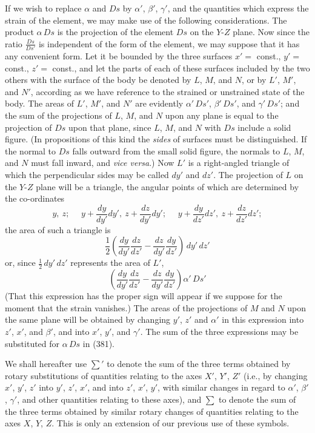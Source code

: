 \documentclass[12pt]{article}
\begin{document}
{If we wish to replace $\alpha$ and $Ds$ by $\alpha'$, $\beta'$, $\gamma'$, and the quantities which express the strain of the element, we may make use of the following considerations. The product $\alpha \, Ds$ is the projection of the element $Ds$ on the $Y$-$Z$ plane. Now since the ratio $\frac{Ds}{Ds'}$ is independent of the form of the element, we may suppose that it has any convenient form. Let it be bounded by the three surfaces $x'=$ const., $y'=$ const., $z'=$ const., and let the parts of each of these surfaces included by the two others with the surface of the body be denoted by $L$, $M$, and $N$, or by $L'$, $M'$, and $N'$, according as we have reference to the strained or unstrained state of the body. The areas of $L'$, $M'$, and $N'$ are evidently $\alpha'\,Ds'$, $\beta'\,Ds'$, and $\gamma'\,Ds'$; and the sum of the projections of $L$, $M$, and $N$ upon any plane is equal to the projection of $Ds$ upon that plane, since $L$, $M$, and $N$ with $Ds$ include a solid figure. (In propositions of this kind the \textit{sides} of surfaces must be distinguished. If the normal to $Ds$ falls outward from the small solid figure, the normals to $L$, $M$, and $N$ must fall inward, and \textit{vice versa}.) Now $L'$ is a right-angled triangle of which the perpendicular sides may be called $dy'$ and $dz'$. The projection of $L$ on the $Y$-$Z$ plane will be a triangle, the angular points of which are determined by the co-ordinates
$$y, \  z; \ \ \ \ \ \ y+ \frac{dy}{dy'}dy', \ z+\frac{dz}{dy'}dy'; \ \ \ \ \ \ y + \frac{dy}{dz'}d z', \  z+ \frac{dz}{dz'}dz';$$
the area of such a triangle is
$$\frac{1}{2}\left(\frac{dy}{dy'} \frac{dz}{dz'} -  \frac{dz}{dy'} \frac{dy}{dz'} \right) \,dy' \,dz'$$
or, since $\frac{1}{2} \, dy' \, dz'$ represents the area of $L'$,
$$
\left(\frac{dy}{dy'}\frac{dz}{dz'}-\frac{dz}{dy'}\frac{dy}{dz'} \right)\alpha'\, Ds'$$
(That this expression has the proper sign will appear if we suppose for the moment that the strain vanishes.) The areas of the projections of $M$ and $N$ upon the same plane will be obtained by changing $y'$, $z'$ and $\alpha'$ in this expression into $z'$, $x'$, and $\beta'$, and into $x'$, $y'$, and $\gamma'$. The sum of the three expressions may be substituted for $\alpha \,Ds$ in (381).


We shall hereafter use $\sum\nolimits'$ to denote the sum of the three terms obtained by rotary substitutions of quantities relating to the axes $X'$, $Y'$, $Z'$ (i.e., by changing $x'$, $y'$, $z'$ into $y'$, $z'$, $x'$, and into $z'$, $x'$, $y'$, with similar changes in regard to $\alpha'$, $\beta'$, $\gamma'$, and other quantities relating to these axes), and $\sum$ to denote the sum of the three terms obtained by similar rotary changes of quantities relating to the axes $X$, $Y$, $Z$. This is only an extension of our previous use of these symbols.


}
\end{document}
